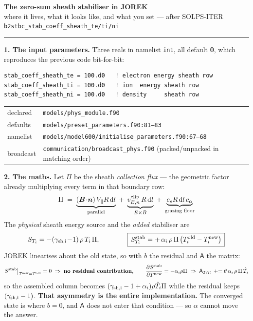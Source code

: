 \documentclass[11pt,a4paper]{article}
\newcommand{\code}[1]{\texttt{\small #1}}
\newcommand{\Told}{T^{\rm old}}\newcommand{\Tnew}{T^{\rm new}}
\begin{document}
{\large\bfseries The zero-sum sheath stabiliser in JOREK}\\[1pt]
{\footnotesize where it lives, what it looks like, and what you set ---
after SOLPS-ITER \code{b2stbc\_stab\_coeff\_sheath\_te/ti/ni}}
\vspace{3pt}\hrule\vspace{7pt}

\textbf{1. The input parameters.} Three reals in namelist \code{in1}, all default \textbf{0},
which reproduces the previous code bit-for-bit:
\begin{lstlisting}
stab_coeff_sheath_te = 100.d0   ! electron energy sheath row
stab_coeff_sheath_ti = 100.d0   ! ion  energy sheath row
stab_coeff_sheath_ni = 100.d0   ! density     sheath row
\end{lstlisting}
\vspace{-3pt}
{\small
\begin{tabular}{@{}ll@{}}
declared & \code{models/phys\_module.f90}\\
defaults & \code{models/preset\_parameters.f90:81--83}\\
namelist & \code{models/model600/initialise\_parameters.f90:67--68}\\
broadcast & \code{communication/broadcast\_phys.f90} (packed/unpacked in matching order)\\
\end{tabular}}

\vspace{7pt}
\textbf{2. The maths.} Let $\Pi$ be the sheath \emph{collection flux} --- the geometric factor
already multiplying every term in that boundary row:
\[
\Pi \;=\;\underbrace{(\bm B\!\cdot\!\bm n)\,V_\parallel R\,\mathrm{d}l}_{\text{parallel}}
\;+\;\underbrace{v_{E,n}^{\rm clip}\,R\,\mathrm{d}l}_{E\times B}
\;+\;\underbrace{c_s R\,\mathrm{d}l\,c_\alpha}_{\text{grazing floor}}
\]
The \emph{physical} sheath energy source and the \emph{added} stabiliser are
\[
S_{T_i}= -(\gamma_{\rm sh,i}\!-\!1)\,\rho\,T_i\,\Pi ,
\qquad\qquad
\boxed{\,S^{\rm stab}_{T_i}= +\,\alpha_i\,\rho\,\Pi\,\bigl(\Told_i-\Tnew_i\bigr)\,}
\]
JOREK linearises about the old state, so with $b$ the residual and $\mathsf A$ the matrix:
\[
S^{\rm stab}\big|_{\Tnew=\Told}=0
\;\Rightarrow\;\textbf{no residual contribution},
\qquad
\frac{\partial S^{\rm stab}}{\partial \Tnew}=-\alpha_i\rho\Pi
\;\Rightarrow\;
\mathsf A_{T_iT_i}\mathrel{+}=\theta\,\alpha_i\,\rho\,\Pi\,\hat T_i
\]
so the assembled column becomes $(\gamma_{\rm sh,i}-1+\alpha_i)\rho\hat T_i\Pi$ while the residual
keeps $(\gamma_{\rm sh,i}-1)$. \textcolor{hl}{\textbf{That asymmetry is the entire
implementation.}} The converged state is where $b=0$, and $\mathsf A$ does not enter that
condition --- so $\alpha$ cannot move the answer.
\end{document}
